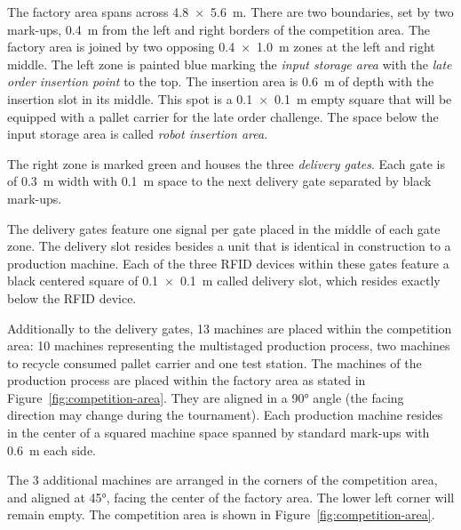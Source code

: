 \documentclass[12pt,twoside]{article}
\begin{document}
The factory area spans across \SI{4.8 x 5.6}{\metre}. There are two
boundaries, set by two mark-ups, \SI{0.4}{\metre} from the left and
right borders of the competition area. The factory area is joined by
two opposing \SI{0.4 x 1.0}{\metre} zones at the left and right
middle. The left zone is painted blue marking the \textit{input
  storage area} with the \textit{late order insertion point} to the
top. The insertion area is \SI{0.6}{\metre} of depth with the
insertion slot in its middle. This spot is a \SI{0.1 x 0.1}{\metre}
empty square that will be equipped with a pallet carrier for the late
order challenge. The space below the input storage area is called
\textit{robot insertion area}.

The right zone is marked green and houses the three \textit{delivery
  gates}.  Each gate is of \SI{0.3}{\metre} width with
\SI{0.1}{\metre} space to the next delivery gate separated by black
mark-ups.

The delivery gates feature one signal per gate placed in the middle of
each gate zone. The delivery slot resides besides a unit that is
identical in construction to a production machine. Each of the three
RFID devices within these gates feature a black centered square of
\SI{0.1 x 0.1}{\metre} called delivery slot, which resides exactly
below the RFID device.

Additionally to the delivery gates, 13 machines are placed within the
competition area: 10 machines representing the multistaged production
process, two machines to recycle consumed pallet carrier and one test
station. The machines of the production process are placed within the
factory area as stated in Figure~\ref{fig:competition-area}. They are
aligned in a \ang{90} angle (the facing direction may change during
the tournament). Each production machine resides in the center of a
squared machine space spanned by standard mark-ups with
\SI{0.6}{\metre} each side.

The 3 additional machines are arranged in the corners of the
competition area, and aligned at \ang{45}, facing the center of the
factory area. The lower left corner will remain empty. The competition
area is shown in Figure~\ref{fig:competition-area}.
\end{document}

